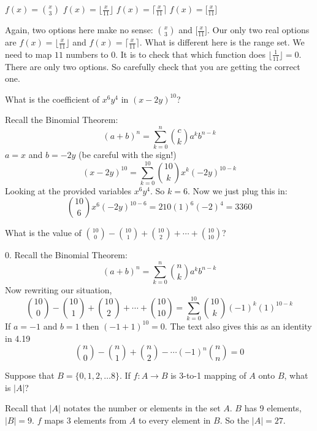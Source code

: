 \documentclass{exam}
\begin{document}
\begin{questions}
    \begin{oneparchoices}
    \choice $f(x)={x \choose 3}$
    \CorrectChoice $f(x)=\lfloor \frac{x}{11} \rfloor$
    \choice $f(x)=\lceil \frac{x}{11} \rceil$
    \choice $f(x)=\lbrack \frac{x}{11} \rbrack$
    \end{oneparchoices}
    \begin{solution}
        Again, two options here make no sense: ${x \choose 3}$ and $\lbrack \frac{x}{11} \rbrack$. Our only two real options are $f(x)=\lfloor \frac{x}{11} \rfloor$ and $f(x)=\lceil \frac{x}{11} \rceil$. What is different here is the range set. We need to map $11$ numbers to $0$. It is to check that which function does $\lfloor \frac{1}{11} \rfloor=0$. There are only two options. So carefully check that you are getting the correct one. 
    \end{solution}

\question What is the coefficient of $x^{6}y^{4}$ in $(x-2y)^{10}$?
    \begin{solution}
        Recall the Binomial Theorem:
        $$(a+b)^{n}=\sum^{n}_{k=0} {c \choose k}a^{k}b^{n-k}$$
        $a=x$ and $b=-2y$ (be careful with the sign!) \\
        $$(x-2y)^{10}= \sum^{10}_{k=0} {10 \choose k}x^{k}(-2y)^{10-k}$$ 
        Looking at the provided variables $x^{6}y^{4}$. So $k=6$. Now we just plug this in: 
        $${10 \choose 6}x^{6}(-2y)^{10-6}=210(1)^{6}(-2)^{4}=3360$$ 
    \end{solution}

\question What is the value of 
${10 \choose 0}-{10 \choose 1}+{10 \choose 2}+\cdots+{10 \choose 10}$?
    \begin{solution}
        0. Recall the Binomial Theorem:
        $$(a+b)^{n}=\sum^{n}_{k=0} \binom{n}{k} a^{k}b^{n-k}$$ Now rewriting our situation, 
        $${10 \choose 0}-{10 \choose 1}+{10 \choose 2}+\cdots+{10 \choose 10}=\sum^{10}_{k=0} {10 \choose k}(-1)^{k}(1)^{10-k}$$
        If $a=-1$ and $b=1$ then $(-1+1)^{10}=0$. The text also gives this as an identity in 4.19 $$\binom{n}{0}-\binom{n}{1}+\binom{n}{2}-\cdots (-1)^{n}\binom{n}{n}=0$$  
    \end{solution}
\question Suppose that $B=\{0,1,2,\dots 8 \}$. If $f:A\rightarrow B$ is 3-to-1 mapping of $A$ onto $B$, what is $|A|$?

    \begin{solution}
        Recall that $|A|$ notates the number or elements in the set $A$. $B$ has 9 elements, $|B|=9$. $f$ maps 3 elements from $A$ to every element in $B$. So the $|A|=27$.
    \end{solution}



\end{questions}
\newpage
\end{document}
